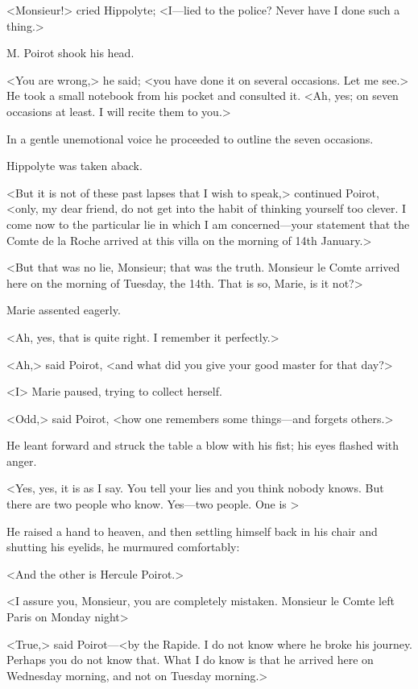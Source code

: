 <Monsieur!> cried Hippolyte; <I—lied to the police? Never have I done such a thing.>

M. Poirot shook his head.

<You are wrong,> he said; <you have done it on several occasions. Let me see.> He took a small notebook from his pocket and consulted it. <Ah, yes; on seven occasions at least. I will recite them to you.>

In a gentle unemotional voice he proceeded to outline the seven occasions.

Hippolyte was taken aback.

<But it is not of these past lapses that I wish to speak,> continued Poirot, <only, my dear friend, do not get into the habit of thinking yourself too clever. I come now to the particular lie in which I am concerned—your statement that the Comte de la Roche arrived at this villa on the morning of 14th January.>

<But that was no lie, Monsieur; that was the truth. Monsieur le Comte arrived here on the morning of Tuesday, the 14th. That is so, Marie, is it not?>

Marie assented eagerly.

<Ah, yes, that is quite right. I remember it perfectly.>

<Ah,> said Poirot, <and what did you give your good master for  that day?>

<I\longdash> Marie paused, trying to collect herself.

<Odd,> said Poirot, <how one remembers some things—and forgets others.>

He leant forward and struck the table a blow with his fist; his eyes flashed with anger.

<Yes, yes, it is as I say. You tell your lies and you think nobody knows. But there are two people who know. Yes—two people. One is \longdash>

He raised a hand to heaven, and then settling himself back in his chair and shutting his eyelids, he murmured comfortably:

<And the other is Hercule Poirot.>

<I assure you, Monsieur, you are completely mistaken. Monsieur le Comte left Paris on Monday night\longdash>

<True,> said Poirot—<by the Rapide. I do not know where he broke his journey. Perhaps you do not know that. What I do know is that he arrived here on Wednesday morning, and not on Tuesday morning.>

